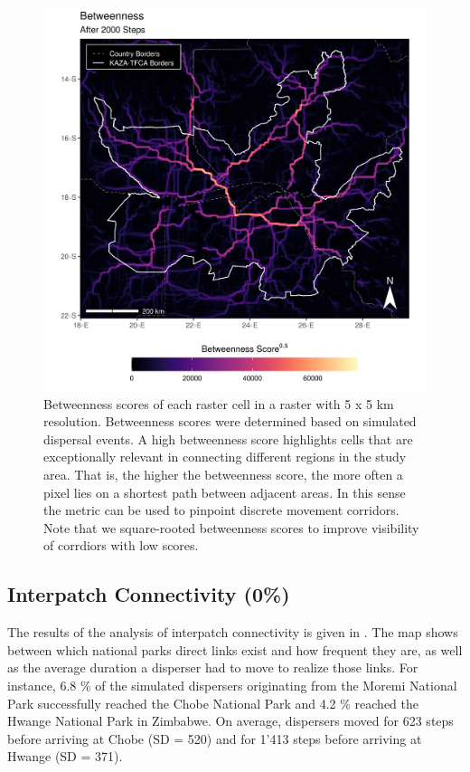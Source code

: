 \documentclass[abstract=on,10pt,a4paper,bibliography=totocnumbered]{article}
\begin{document}
\begin{figure}
  \includegraphics[width=\textwidth]{99_Betweenness.png}
  \caption{Betweenness scores of each raster cell in a raster with 5 x 5 km
  resolution. Betweenness scores were determined based on simulated dispersal
  events. A high betweenness score highlights cells that are exceptionally
  relevant in connecting different regions in the study area. That is, the
  higher the betweenness score, the more often a pixel lies on a shortest path
  between adjacent areas. In this sense the metric can be used to pinpoint
  discrete movement corridors. Note that we square-rooted betweenness scores to
  improve visibility of corrdiors with low scores.}
  \label{Betweenness}
\end{figure}

\subsection{Interpatch Connectivity (0\%)}
The results of the analysis of interpatch connectivity is given in
. The map shows between which national parks direct links
exist and how frequent they are, as well as the average duration a disperser had
to move to realize those links. For instance, 6.8 \% of the simulated dispersers
originating from the Moremi National Park successfully reached the Chobe
National Park and 4.2 \% reached the Hwange National Park in Zimbabwe. On
average, dispersers moved for 623 steps before arriving at Chobe (SD = 520) and
for 1'413 steps before arriving at Hwange (SD = 371).
\end{document}

